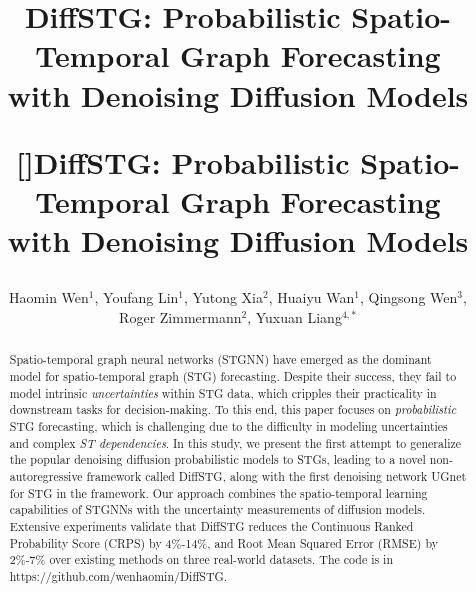 \title{[]{DiffSTG: Probabilistic Spatio-Temporal Graph Forecasting  \\ with Denoising Diffusion Models}



\title[]{DiffSTG: Probabilistic Spatio-Temporal Graph Forecasting  \\ with Denoising Diffusion Models}
	

    \author{Haomin Wen$^{1}$, Youfang Lin$^{1}$, Yutong Xia$^{2}$, Huaiyu Wan$^{1}$,  Qingsong Wen$^{3}$, \\ Roger Zimmermann$^{2}$, Yuxuan Liang$^{4, *}$}
   
 
	
	
 \renewcommand{\shortauthors}{Haomin Wen et al.}
	

\begin{abstract}
    \par Spatio-temporal graph neural networks (STGNN) have emerged as the dominant model for spatio-temporal graph (STG) forecasting. Despite their success, they fail to model intrinsic \emph{uncertainties} within STG data, which cripples their practicality in downstream tasks for decision-making. To this end, this paper focuses on \emph{probabilistic} STG forecasting, which is challenging due to the difficulty in modeling uncertainties and complex \emph{ST dependencies}. In this study, we present the first attempt to generalize the popular denoising diffusion probabilistic models to STGs, leading to a novel non-autoregressive framework called DiffSTG, along with the first denoising network UGnet for STG in the framework. Our approach combines the spatio-temporal learning capabilities of STGNNs with the uncertainty measurements of diffusion models.   Extensive experiments validate that DiffSTG reduces the Continuous Ranked Probability Score (CRPS) by 4\%-14\%, and Root Mean Squared Error (RMSE) by 2\%-7\% over existing methods on three real-world datasets. The code is in https://github.com/wenhaomin/DiffSTG.
\end{abstract}
	
}
